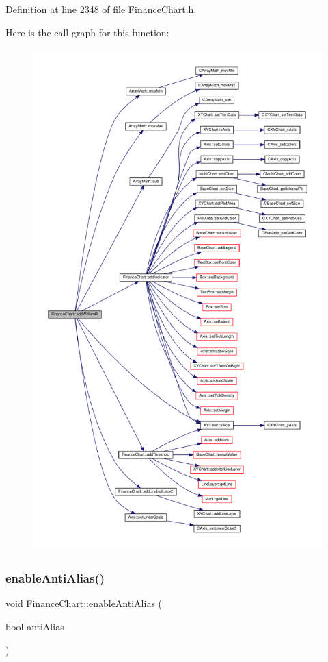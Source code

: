 Definition at line 2348 of file Finance\+Chart.\+h.

Here is the call graph for this function\+:
\nopagebreak
\begin{figure}[H]
\begin{center}
\leavevmode
\includegraphics[height=550pt]{class_finance_chart_aa0f6a518a8fb451cc645f10e3e947ff0_cgraph}
\end{center}
\end{figure}
\mbox{\label{class_finance_chart_aa6caba757aea3f8bd1fd2a6c978a563d}} 
\subsubsection{\texorpdfstring{enable\+Anti\+Alias()}{enableAntiAlias()}}
{\footnotesize\ttfamily void Finance\+Chart\+::enable\+Anti\+Alias (\begin{DoxyParamCaption}\item[{bool}]{anti\+Alias }\end{DoxyParamCaption})\hspace{0.3cm}{\ttfamily [inline]}}



